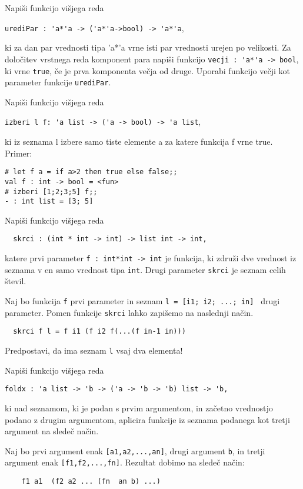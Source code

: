 \begin{ex}
Napi\v si funkcijo vi\v sjega reda 
\begin{center}
\lstinline{urediPar : 'a*'a -> ('a*'a->bool) -> 'a*'a}, 
\end{center}
ki za dan par vrednosti tipa 'a*'a vrne isti par vrednosti urejen po velikosti. Za dolo\v citev vrstnega reda komponent para napi\v si funkcijo 
\lstinline{vecji : 'a*'a -> bool}, 
ki vrne \lstinline{true}, \v ce je prva komponenta ve\v cja od druge. Uporabi funkcijo ve\v cji kot parameter funkcije \lstinline{urediPar}.

\end{ex}
\begin{ex}
Napi\v si funkcijo vi\v sjega reda 
\begin{center}
\lstinline{izberi l f: 'a list -> ('a -> bool) -> 'a list},
\end{center}
ki iz seznama l izbere samo
tiste elemente a za katere funkcija f vrne true.
Primer: 
\begin{lstlisting}
# let f a = if a>2 then true else false;;
val f : int -> bool = <fun>
# izberi [1;2;3;5] f;;
- : int list = [3; 5]
\end{lstlisting}
\end{ex}
\begin{ex}
  Napi\v si funkcijo vi\v sjega reda

  \begin{lstlisting}
  skrci : (int * int -> int) -> list int -> int,
  \end{lstlisting}
  katere prvi parameter \lstinline{f : int*int -> int} je funkcija, ki
  zdru\v zi dve vrednost iz seznama v en samo vrednost tipa
  \lstinline{int}. Drugi parameter \lstinline{skrci} je seznam celih \v
  stevil.

  Naj bo funkcija \lstinline{f} prvi parameter in seznam \lstinline{l = [i1; i2; ...; in] } drugi parameter. Pomen funkcije \lstinline{skrci}
  lahko zapi\v semo na naslednji na\v cin.

  \begin{lstlisting}
  skrci f l = f i1 (f i2 f(...(f in-1 in)))
  \end{lstlisting}
  Predpostavi, da ima seznam \lstinline{l} vsaj dva elementa!


\end{ex}
\begin{ex}
Napi\v si funkcijo vi\v sjega reda 

\begin{lstlisting}
foldx : 'a list -> 'b -> ('a -> 'b -> 'b) list -> 'b,
\end{lstlisting}
ki nad seznamom, ki je podan s prvim argumentom, in za\v cetno vrednostjo podano z drugim argumentom, aplicira funkcije iz seznama podanega kot tretji argument na slede\v c na\v cin. 

Naj bo prvi argument enak \lstinline{[a1,a2,...,an]},
drugi argument \lstinline{b}, in tretji argument enak
\lstinline{[f1,f2,...,fn]}. 
Rezultat dobimo na slede\v c na\v cin: 
\begin{lstlisting}
    f1 a1  (f2 a2 ... (fn  an b) ...)
\end{lstlisting}


\end{ex} 

